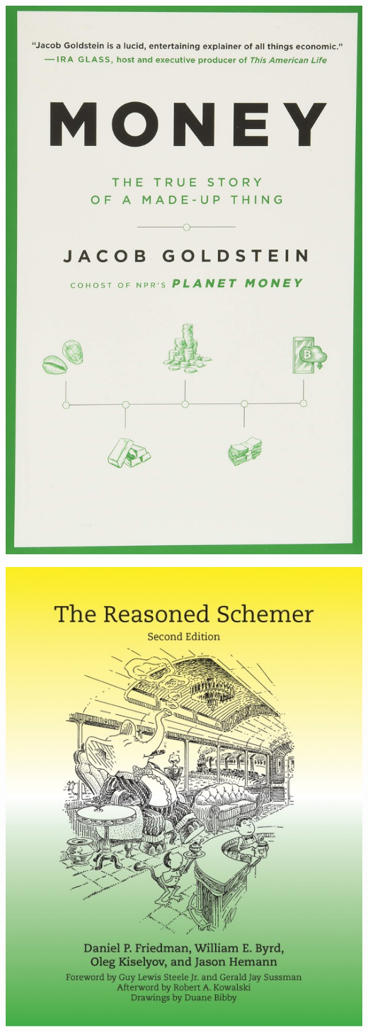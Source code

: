 \documentclass[11pt]{article}
\begin{document}
\begin{center}
\includegraphics[width=.9\linewidth]{img/books/goldstein-money.jpg}
\end{center}

\begin{center}
\includegraphics[width=.9\linewidth]{img/books/friedman-reasoned-schemer.jpg}
\end{center}
\end{document}

